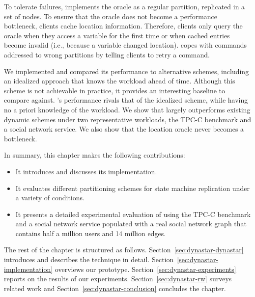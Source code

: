 To tolerate failures, \dynastar implements the oracle as a regular partition,
replicated in a set of nodes. To ensure that the oracle does not become a
performance bottleneck, clients cache location information. Therefore, clients
only query the oracle when they access a variable for the first time or when
cached entries become invalid (i.e., because a variable changed location).
\dynastar copes with commands addressed to wrong partitions by telling clients
to retry a command.

We implemented \dynastar and compared its performance to alternative schemes,
including an idealized approach that knows the workload ahead of time. Although
this scheme is not achievable in practice, it provides an interesting baseline
to compare against. \dynastar's performance rivals that of the idealized scheme,
while having no a priori knowledge of the workload.
We show that \dynastar largely outperforms existing dynamic schemes under two
representative workloads, the TPC-C benchmark and a social network service. We
also show that the location oracle never becomes a bottleneck.

In summary, this chapter makes the following contributions:
\begin{itemize}
\item It introduces \dynastar and discusses its implementation.
\item It evaluates different partitioning schemes for state machine replication
under a variety of conditions.
\item It presents a detailed experimental evaluation of \dynastar using the
TPC-C benchmark and a social network service populated with a real social
network graph that contains half a million users and 14 million edges.
\end{itemize}


The rest of the chapter is structured as follows.
Section~\ref{sec:dynastar-dynastar} introduces \dynastar and describes the technique in detail.
Section~\ref{sec:dynastar-implementation} overviews our prototype.
Section~\ref{sec:dynastar-experiments} reports on the results of our experiments.
Section~\ref{sec:dynastar-rw} surveys related work and
Section~\ref{sec:dynastar-conclusion} concludes the chapter.

